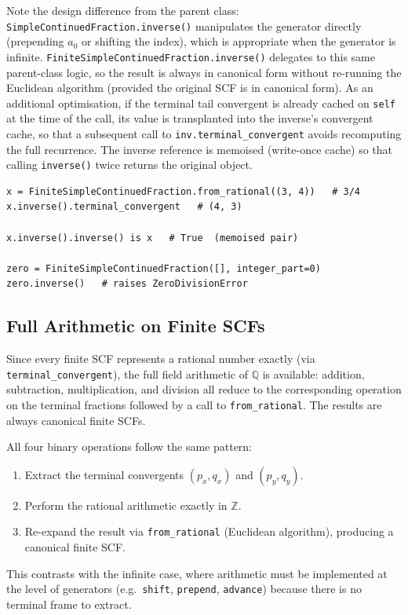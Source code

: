 Note the design difference from the parent class:
\texttt{SimpleContinuedFraction.inverse()} manipulates the generator directly
(prepending $a_0$ or shifting the index), which is appropriate when the
generator is infinite.  \texttt{FiniteSimpleContinuedFraction.inverse()}
delegates to this same parent-class logic, so the result is always in
canonical form without re-running the Euclidean algorithm (provided 
the original SCF is in canonical form).  As an additional
optimisation, if the terminal tail convergent is already cached on \texttt{self}
at the time of the call, its value is transplanted into the inverse's
convergent cache, so that a subsequent call to
\texttt{inv.terminal\_convergent} avoids recomputing the full recurrence.  The
inverse reference is memoised (write-once cache) so that calling \texttt{inverse()}
twice returns the original object.

\begin{catenadef}
\begin{lstlisting}[style=python]
x = FiniteSimpleContinuedFraction.from_rational((3, 4))   # 3/4
x.inverse().terminal_convergent   # (4, 3)

x.inverse().inverse() is x   # True  (memoised pair)

zero = FiniteSimpleContinuedFraction([], integer_part=0)
zero.inverse()   # raises ZeroDivisionError
\end{lstlisting}
\end{catenadef}

\subsection{Full Arithmetic on Finite SCFs}

Since every finite SCF represents a rational number exactly (via
\texttt{terminal\_convergent}), the full field arithmetic of $\mathbb{Q}$ is
available: addition, subtraction, multiplication, and division all reduce to
the corresponding operation on the terminal fractions followed by a call to
\texttt{from\_rational}.  The results are always canonical finite SCFs.

\begin{remark}
  All four binary operations follow the same pattern:
  \begin{enumerate}
    \item Extract the terminal convergents $(p_x, q_x)$ and $(p_y, q_y)$.
    \item Perform the rational arithmetic exactly in $\mathbb{Z}$.
    \item Re-expand the result via \texttt{from\_rational} (Euclidean
          algorithm), producing a canonical finite SCF.
  \end{enumerate}
  This contrasts with the infinite case, where arithmetic must be implemented
  at the level of generators (e.g.\ \texttt{shift}, \texttt{prepend},
  \texttt{advance}) because there is no terminal frame to extract.
\end{remark}

